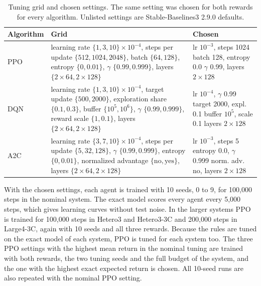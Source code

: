 \documentclass[journal]{IEEEtran}
\begin{document}
\begin{table}[t]
\caption{Tuning grid and chosen settings. The same setting was chosen for both rewards for every algorithm. Unlisted settings are Stable-Baselines3 2.9.0 defaults.}
\label{tab:hyper}
\centering
\footnotesize
\setlength{\tabcolsep}{2.5pt}
\begin{tabular}{@{}l>{\raggedright\arraybackslash}p{3.6cm}l@{}}
\toprule
Algorithm & Grid & Chosen \\
\midrule
PPO & learning rate $\{1,3,10\}\times10^{-4}$, steps per update $\{512, 1024, 2048\}$, batch $\{64,128\}$, entropy $\{0, 0.01\}$, $\gamma$ $\{0.99, 0.999\}$, layers $\{2\times64, 2\times128\}$ & \shortstack[l]{lr $10^{-3}$, steps 1024\\batch 128, entropy 0.0\\$\gamma$ 0.99, layers $2\times128$} \\
\addlinespace
DQN & learning rate $\{1,3,10\}\times10^{-4}$, target update $\{500, 2000\}$, exploration share $\{0.1,0.3\}$, buffer $\{10^5,10^6\}$, $\gamma$ $\{0.99,0.999\}$, reward scale $\{1, 0.1\}$, layers $\{2\times64, 2\times128\}$ & \shortstack[l]{lr $10^{-4}$, $\gamma$ 0.99\\target 2000, expl. 0.1\\buffer $10^5$, scale 0.1\\layers $2\times128$} \\
\addlinespace
A2C & learning rate $\{3,7,10\}\times10^{-4}$, steps per update $\{5, 32, 128\}$, $\gamma$ $\{0.99,0.999\}$, entropy $\{0,0.01\}$, normalized advantage $\{\text{no},\text{yes}\}$, layers $\{2\times64, 2\times128\}$ & \shortstack[l]{lr $10^{-3}$, steps 5\\entropy 0.0, $\gamma$ 0.999\\norm. adv. no, layers $2\times128$} \\
\bottomrule
\end{tabular}
\end{table}

With the chosen settings, each agent is trained with 10 seeds, 0 to 9, for 100,000 steps in the nominal system. The exact model scores every agent every 5,000 steps, which gives learning curves without test noise. In the larger systems PPO is trained for 100,000 steps in Hetero3 and Hetero3-3C and 200,000 steps in Large4-3C, again with 10 seeds and all three rewards. Because the rules are tuned on the exact model of each system, PPO is tuned for each system too. The three PPO settings with the highest mean return in the nominal tuning are trained with both rewards, the two tuning seeds and the full budget of the system, and the one with the highest exact expected return is chosen. All 10-seed runs are also repeated with the nominal PPO setting.
\end{document}
